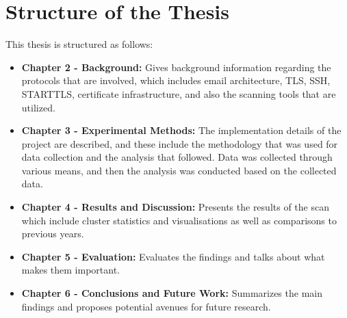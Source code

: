 \section{Structure of the Thesis}

This thesis is structured as follows:

\begin{itemize}
    \item \textbf{Chapter 2 - Background:} Gives background information regarding the protocols that are involved, which includes email architecture, TLS, SSH, STARTTLS, certificate infrastructure, and also the scanning tools that are utilized.
    \item \textbf{Chapter 3 - Experimental Methods:} The implementation details of the project are described, and these include the methodology that was used for data collection and the analysis that followed. Data was collected through various means, and then the analysis was conducted based on the collected data.
    \item \textbf{Chapter 4 - Results and Discussion:} Presents the results of the scan which include cluster statistics and visualisations as well as comparisons to previous years.
    \item \textbf{Chapter 5 - Evaluation:} Evaluates the findings and talks about what makes them important.
    \item \textbf{Chapter 6 - Conclusions and Future Work:} Summarizes the main findings and proposes potential avenues for future research.
\end{itemize}